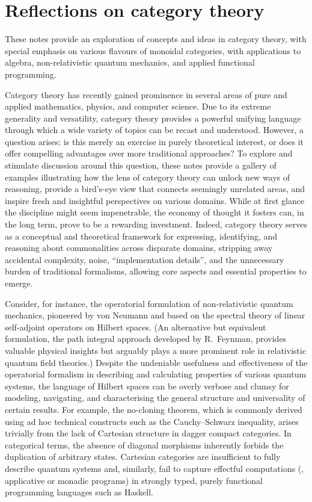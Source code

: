 \chapter*{Reflections on category theory}


These notes provide an exploration of concepts and ideas in category theory, with special emphasis on various flavours of monoidal categories, with applications to algebra, non-relativistic quantum mechanics, and applied functional programming. 

Category theory has recently gained prominence in several areas of pure and applied mathematics, physics, and computer science. 
Due to its extreme generality and versatility, category theory provides a powerful unifying language through which a wide variety of topics can be recast and understood. 
However, a question arises: is this merely an exercise in purely theoretical interest, or does it offer compelling advantages over more traditional approaches? 
To explore and stimulate discussion around this question, these notes provide a gallery of examples illustrating how the lens of category theory can unlock new ways of reasoning, provide a bird's-eye view that connects seemingly unrelated areas, and inspire fresh and insightful perspectives on various domains. 
While at first glance the discipline might seem impenetrable, the economy of thought it fosters can, in the long term, prove to be a rewarding investment.
Indeed, category theory serves as a conceptual and theoretical framework for expressing, identifying, and reasoning about commonalities across disparate domains, stripping away accidental complexity, noise, ``implementation details'', and the unnecessary burden of traditional formalisms, allowing core aspects and essential properties to emerge.

Consider, for instance, the operatorial formulation of non-relativistic quantum mechanics, pioneered by von Neumann and based on the spectral theory of linear self-adjoint operators on Hilbert spaces. (An alternative but equivalent formulation, the path integral approach developed by R.~Feynman, provides valuable physical insights but arguably plays a more prominent role in relativistic quantum field theories.) Despite the undeniable usefulness and effectiveness of the operatorial formalism in describing and calculating properties of various quantum systems, the language of Hilbert spaces can be overly verbose and clumsy for modeling, navigating, and characterising the general structure and universality of certain results.
For example, the no-cloning theorem, which is commonly derived using ad hoc technical constructs such as the Cauchy--Schwarz inequality, arises trivially from the lack of Cartesian structure in dagger compact categories. 
In categorical terms, the absence of diagonal morphisms inherently forbids the duplication of arbitrary states.
Cartesian categories are insufficient to fully describe quantum systems and, similarly, fail to capture effectful computations (\eg, applicative or monadic programs) in strongly typed, purely functional programming languages such as Haskell.

